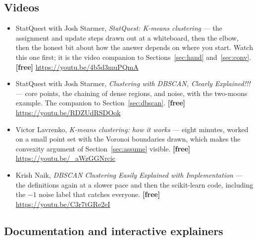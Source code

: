 \documentclass[11pt]{article}
\begin{document}
\subsection*{Videos}

\begin{itemize}[leftmargin=*]
  \item StatQuest with Josh Starmer, \emph{StatQuest: K-means clustering} ---
    the assignment and update steps drawn out at a whiteboard, then the
    elbow, then the honest bit about how the answer depends on where you
    start. Watch this one first; it is the video companion to
    Sections~\ref{sec:hand} and~\ref{sec:conv}. \textbf{[free]}
    \url{https://youtu.be/4b5d3muPQmA}
  \item StatQuest with Josh Starmer, \emph{Clustering with DBSCAN, Clearly
    Explained!!!} --- core points, the chaining of dense regions, and noise,
    with the two-moons example. The companion to Section~\ref{sec:dbscan}.
    \textbf{[free]} \url{https://youtu.be/RDZUdRSDOok}
  \item Victor Lavrenko, \emph{K-means clustering: how it works} --- eight
    minutes, worked on a small point set with the Voronoi boundaries drawn,
    which makes the convexity argument of Section~\ref{sec:assume} visible.
    \textbf{[free]} \url{https://youtu.be/_aWzGGNrcic}
  \item Krish Naik, \emph{DBSCAN Clustering Easily Explained with
    Implementation} --- the definitions again at a slower pace and then the
    scikit-learn code, including the $-1$ noise label that catches everyone.
    \textbf{[free]} \url{https://youtu.be/C3r7tGRe2eI}
\end{itemize}

\subsection*{Documentation and interactive explainers}
\end{document}
